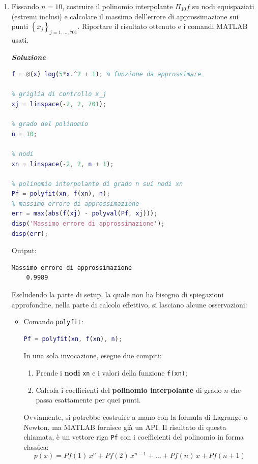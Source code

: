 \begin{enumerate}
    \item Fissando $n = 10$, costruire il polinomio interpolante $\Pi_{10} f$ su nodi equispaziati (estremi inclusi) e calcolare il massimo dell'errore di approssimazione sui punti $\left\{\bar{x}_{j}\right\}_{j = 1, \dots, 701}$. Riportare il risultato ottenuto e i comandi MATLAB usati.
    
    \textcolor{Green3}{\textbf{\emph{Soluzione}}}
    \begin{lstlisting}[language=MATLAB]
% funzione
f = @(x) log(5*x.^2 + 1); % funzione da approssimare

% griglia di controllo x_j
xj = linspace(-2, 2, 701);

% grado del polinomio
n = 10;

% nodi
xn = linspace(-2, 2, n + 1);

% polinomio interpolante di grado n sui nodi xn
Pf = polyfit(xn, f(xn), n);
% massimo errore di approssimazione
err = max(abs(f(xj) - polyval(Pf, xj)));
disp('Massimo errore di approssimazione');
disp(err);\end{lstlisting}
    Output:
    \begin{lstlisting}
Massimo errore di approssimazione
    0.9989\end{lstlisting}
    Escludendo la parte di setup, la quale non ha bisogno di spiegazioni approfondite, nella parte di calcolo effettivo, si lasciano alcune osservazioni:
    \begin{itemize}
        \item Comando \texttt{polyfit}:
        \begin{lstlisting}[language=MATLAB]
Pf = polyfit(xn, f(xn), n);\end{lstlisting}
        In una sola invocazione, esegue due compiti:
        \begin{enumerate}
            \item Prende i \textbf{nodi} \texttt{xn} e i valori della funzione \texttt{f(xn)};
            \item Calcola i coefficienti del \textbf{polinomio interpolante} di grado $n$ che passa esattamente per quei punti.
        \end{enumerate}
        Ovviamente, si potrebbe costruire a mano con la formula di Lagrange o Newton, ma MATLAB fornisce già un API. Il risultato di questa chiamata, è un vettore riga \texttt{Pf} con i coefficienti del polinomio in forma classica:
        \begin{equation*}
            p(x) = Pf(1) \, x^n + Pf(2) \, x^{n-1} + \dots + Pf(n) \, x + Pf(n+1)
        \end{equation*}



\end{itemize}
\end{enumerate}

